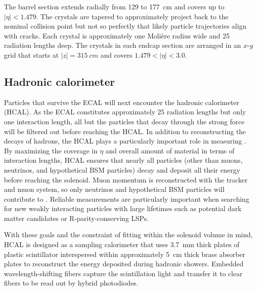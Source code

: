 

The barrel section extends radially from \num{129} to \SI{177}{cm} and covers up to $|\eta|<1.479$. The crystals are tapered to approximately project back to the nominal collision point but not so perfectly that likely particle trajectories align with cracks. Each crystal is approximately one Moli\`ere radius wide and 25 radiation lengths deep. The crystals in each endcap section are arranged in an $x$-$y$ grid that starts at $|z|=\SI{315}{cm}$ and covers $1.479<|\eta|<3.0$.


\subsection{Hadronic calorimeter}
Particles that survive the ECAL will next encounter the hadronic calorimeter (HCAL). As the ECAL constitutes approximately 25 radiation lengths but only one interaction length, all but the particles that decay through the strong force will be filtered out before reaching the HCAL. In addition to reconstructing the decays of hadrons, the HCAL plays a particularly important role in measuring \ptmiss. By maximizing the coverage in $\eta$ and overall amount of material in terms of interaction lengths, HCAL ensures that nearly all particles (other than muons, neutrinos, and hypothetical BSM particles) decay and deposit all their energy before reaching the solenoid. Muon momentum is reconstructed with the tracker and muon system, so only neutrinos and hypothetical BSM particles will contribute to \ptmiss. Reliable \ptmiss measurements are particularly important when searching for new weakly interacting particles with large lifetimes such as potential dark matter candidates or R-parity-conserving LSPs.

With these goals and the constraint of fitting within the solenoid volume in mind, HCAL is designed as a sampling calorimeter that uses \SI{3.7}{\milli\metre} thick plates of plastic scintillator interspersed within approximately \SI{5}{\cm} thick brass absorber plates to reconstruct the energy deposited during hadronic showers. Embedded wavelength-shifting fibers capture the scintillation light and transfer it to clear fibers to be read out by hybrid photodiodes.


